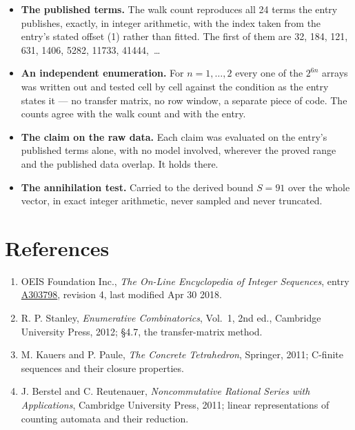 \documentclass[11pt]{article}
\theoremstyle{definition}
\begin{document}
\begin{itemize}

\item {\bfseries The published terms.} The walk count reproduces all 24 terms the entry publishes, exactly, in integer arithmetic, with the index taken from the entry's stated offset (1) rather than fitted. The first of them are 32, 184, 121, 631, 1406, 5282, 11733, 41444,~\dots

\item {\bfseries An independent enumeration.} For $n = 1,\dots,2$ every one of the $2^{6n}$ arrays was written out and tested cell by cell against the condition as the entry states it --- no transfer matrix, no row window, a separate piece of code. The counts agree with the walk count and with the entry.

\item {\bfseries The claim on the raw data.} Each claim was evaluated on the entry's published terms alone, with no model involved, wherever the proved range and the published data overlap. It holds there.

\item {\bfseries The annihilation test.} Carried to the derived bound $S = 91$ over the whole vector, in exact integer arithmetic, never sampled and never truncated.

\end{itemize}

\section{References}

\begin{enumerate}

\item OEIS Foundation Inc., \emph{The On-Line Encyclopedia of Integer Sequences}, entry \href{https://oeis.org/A303798}{A303798}, revision 4, last modified Apr 30 2018.

\item R. P. Stanley, \emph{Enumerative Combinatorics}, Vol.~1, 2nd ed., Cambridge University Press, 2012; \S4.7, the transfer-matrix method.

\item M. Kauers and P. Paule, \emph{The Concrete Tetrahedron}, Springer, 2011; C-finite sequences and their closure properties.

\item J. Berstel and C. Reutenauer, \emph{Noncommutative Rational Series with Applications}, Cambridge University Press, 2011; linear representations of counting automata and their reduction.

\end{enumerate}
\end{document}

